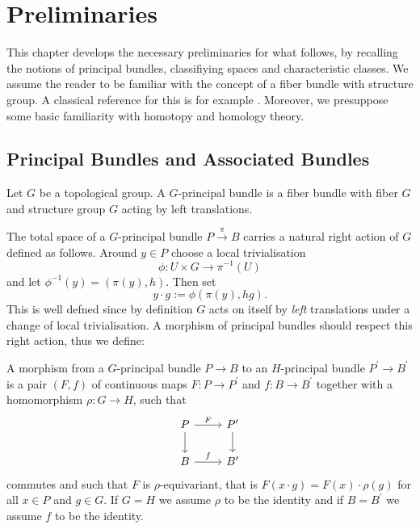 \chapter{Preliminaries}
\label{sec:bundles}

This chapter develops the necessary preliminaries for what follows, by recalling the notions of principal bundles, classifiying spaces and characteristic classes. We assume the reader to be familiar with the concept of a fiber bundle with structure group. A classical reference for this is for example \cite{steenrod1951topology}. Moreover, we presuppose some basic familiarity with homotopy and homology theory.

\section{Principal Bundles and Associated Bundles}
\label{subsec:principal_bundles}

\begin{definition}
    \label{bundles:def:principal_bundle}
    Let $G$ be a topological group. A $G$-principal bundle is a fiber bundle with fiber $G$ and structure group $G$ acting by left translations.
\end{definition}

The total space of a $G$-principal bundle $P \xrightarrow{\pi} B$ carries a natural right action of $G$ defined as follows. Around $y \in P$ choose a local trivialisation
\[
\phi \colon U \times G \to \pi^{-1}(U)
\]
and let $\phi^{-1}(y) = (\pi(y),h)$. Then set 
\[
y \cdot g := \phi(\pi(y),hg).
\]
This is well defned since by definition $G$ acts on itself by \textit{left} translations under a change of local trivialisation. 
A morphism of principal bundles should respect this right action, thus we define:

\begin{definition}
    \label{bundles:def:principal_bundles_morphism}
    A morphism from a $G$-principal bundle $P \to B$ to an $H$-principal bundle $P^\prime \to B^\prime$ is a pair $(F,f)$ of continuous maps $F \colon P \to P^\prime$ and $f \colon B \to B^\prime$ together with a homomorphism $\rho \colon G \to H$, such that 
    \[\begin{tikzcd}
	P & {P^\prime} \\
	B & {B^\prime}
	\arrow["F", from=1-1, to=1-2]
	\arrow[from=1-1, to=2-1]
	\arrow[from=1-2, to=2-2]
	\arrow["f", from=2-1, to=2-2]
    \end{tikzcd}\]
    commutes and such that $F$ is $\rho$-equivariant, that is $F(x \cdot g) = F(x) \cdot \rho(g)$ for all $x \in P$ and $g \in G$. If $G=H$ we assume $\rho$ to be the identity and if $B = B^\prime$ we assume $f$ to be the identity.
\end{definition}

